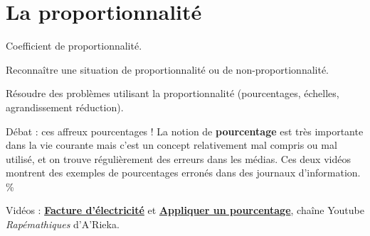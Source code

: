 \graphicspath{{../../S24_la_Proportionnalite/Images/}}

\themeO
\chapter{La proportionnalité}
\label{S24}

\programme%
   {\item Coefficient de proportionnalité.}
   {\item Reconnaître une situation de proportionnalité ou de non-proportionnalité.
    \item Résoudre des problèmes utilisant la proportionnalité (pourcentages, échelles, agrandissement réduction).}

\vfill

\begin{debat}{Débat : ces affreux pourcentages !}
   La notion de {\bf pourcentage} est très importante dans la vie courante mais c'est un concept relativement mal compris ou mal utilisé, et on trouve régulièrement des erreurs dans les médias. Ces deux vidéos montrent des exemples de pourcentages erronés dans des journaux d'information.
   \tcblower
      \fontsize{70}{80}\selectfont \%
\end{debat}

\hfill {\gray Vidéos : \href{https://www.youtube.com/watch?v=gLbsxj8mv-U}{\bf Facture d'électricité} et \href{https://www.youtube.com/watch?v=gXcwdDYSMeM&t=118s}{\bf Appliquer un pourcentage}, chaîne Youtube {\it Rapémathiques} d'A'Rieka.}


